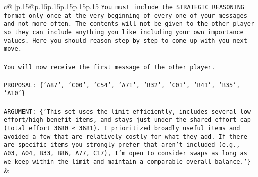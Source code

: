 \documentclass{article}
\begin{document}
{\begin{supertabular}{c@{$\;$}|p{.15\linewidth}@{}p{.15\linewidth}p{.15\linewidth}p{.15\linewidth}p{.15\linewidth}p{.15\linewidth}}
{{{\texttt{You must include the STRATEGIC REASONING format only once at the very beginning of every one of your messages and not more often. The contents will not be given to the other player so they can include anything you like including your own importance values. Here you should reason step by step to come up with you next move.} \\
\\ 
\texttt{You will now receive the first message of the other player.} \\
\\ 
\texttt{PROPOSAL: \{'A87', 'C00', 'C54', 'A71', 'B32', 'C01', 'B41', 'B35', 'A10'\}} \\
\\ 
\texttt{ARGUMENT: \{'This set uses the limit efficiently, includes several low{-}effort/high{-}benefit items, and stays just under the shared effort cap (total effort 3680 ≤ 3681). I prioritized broadly useful items and avoided a few that are relatively costly for what they add. If there are specific items you strongly prefer that aren’t included (e.g., A03, A04, B33, B86, A77, C17), I’m open to consider swaps as long as we keep within the limit and maintain a comparable overall balance.'\}} \\
            }
        }
    }
    & \\ \\


\end{supertabular}}
\end{document}
